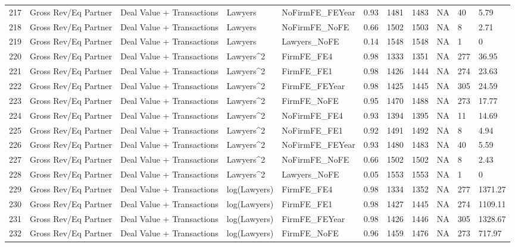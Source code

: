 \documentclass{article}
\begin{document}
\begin{table}[H]
\begin{tabular}{rllllllllll}
  217 & Gross Rev/Eq Partner & Deal Value + Transactions & Lawyers & NoFirmFE\_FEYear & 0.93 & 1481 & 1483 & NA & 40 & 5.79 \\ 
  218 & Gross Rev/Eq Partner & Deal Value + Transactions & Lawyers & NoFirmFE\_NoFE & 0.66 & 1502 & 1503 & NA & 8 & 2.71 \\ 
  219 & Gross Rev/Eq Partner & Deal Value + Transactions & Lawyers & Lawyers\_NoFE & 0.14 & 1548 & 1548 & NA & 1 & 0 \\ 
  220 & Gross Rev/Eq Partner & Deal Value + Transactions & Lawyers^2 & FirmFE\_FE4 & 0.98 & 1333 & 1351 & NA & 277 & 36.95 \\ 
  221 & Gross Rev/Eq Partner & Deal Value + Transactions & Lawyers^2 & FirmFE\_FE1 & 0.98 & 1426 & 1444 & NA & 274 & 23.63 \\ 
  222 & Gross Rev/Eq Partner & Deal Value + Transactions & Lawyers^2 & FirmFE\_FEYear & 0.98 & 1425 & 1445 & NA & 305 & 24.59 \\ 
  223 & Gross Rev/Eq Partner & Deal Value + Transactions & Lawyers^2 & FirmFE\_NoFE & 0.95 & 1470 & 1488 & NA & 273 & 17.77 \\ 
  224 & Gross Rev/Eq Partner & Deal Value + Transactions & Lawyers^2 & NoFirmFE\_FE4 & 0.93 & 1394 & 1395 & NA & 11 & 14.69 \\ 
  225 & Gross Rev/Eq Partner & Deal Value + Transactions & Lawyers^2 & NoFirmFE\_FE1 & 0.92 & 1491 & 1492 & NA & 8 & 4.94 \\ 
  226 & Gross Rev/Eq Partner & Deal Value + Transactions & Lawyers^2 & NoFirmFE\_FEYear & 0.93 & 1480 & 1483 & NA & 40 & 5.59 \\ 
  227 & Gross Rev/Eq Partner & Deal Value + Transactions & Lawyers^2 & NoFirmFE\_NoFE & 0.66 & 1502 & 1502 & NA & 8 & 2.43 \\ 
  228 & Gross Rev/Eq Partner & Deal Value + Transactions & Lawyers^2 & Lawyers\_NoFE & 0.05 & 1553 & 1553 & NA & 1 & 0 \\ 
  229 & Gross Rev/Eq Partner & Deal Value + Transactions & log(Lawyers) & FirmFE\_FE4 & 0.98 & 1334 & 1352 & NA & 277 & 1371.27 \\ 
  230 & Gross Rev/Eq Partner & Deal Value + Transactions & log(Lawyers) & FirmFE\_FE1 & 0.98 & 1427 & 1445 & NA & 274 & 1109.11 \\ 
  231 & Gross Rev/Eq Partner & Deal Value + Transactions & log(Lawyers) & FirmFE\_FEYear & 0.98 & 1426 & 1446 & NA & 305 & 1328.67 \\ 
  232 & Gross Rev/Eq Partner & Deal Value + Transactions & log(Lawyers) & FirmFE\_NoFE & 0.96 & 1459 & 1476 & NA & 273 & 717.97 \\ 

\end{tabular}
\end{table}
\end{document}
